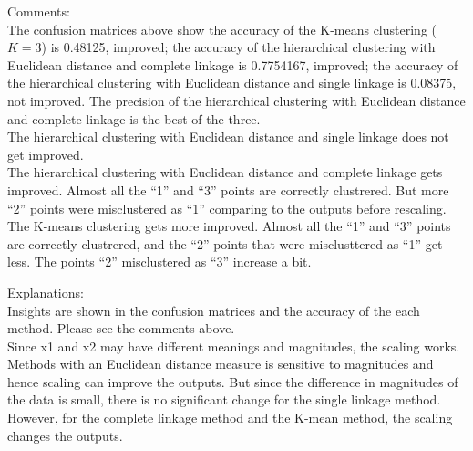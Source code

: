 \documentclass[10pt]{article}
\begin{document}
\begin{enumerate}[1)]
Comments:\\
The confusion matrices above show the accuracy of the K-means clustering ($K=3$) is 0.48125, improved; the accuracy of the hierarchical clustering with Euclidean distance and complete linkage is 0.7754167, improved; the accuracy of the hierarchical clustering with Euclidean distance and single linkage is 0.08375, not improved. The precision of the hierarchical clustering with Euclidean distance and complete linkage is the best of the three.\\
The hierarchical clustering with Euclidean distance and single linkage does not get improved.\\
The hierarchical clustering with Euclidean distance and complete linkage gets improved. Almost all the ``1'' and ``3'' points are correctly clustrered. But more ``2'' points were misclustered as ``1'' comparing to the outputs before rescaling.\\
The K-means clustering gets more improved. Almost all the ``1'' and ``3'' points are correctly clustrered, and the ``2'' points that were misclusttered as ``1'' get less. The points ``2'' misclustered as ``3'' increase a bit. %
\vspace{3mm}

Explanations:\\
Insights are shown in the confusion matrices and the accuracy of the each method. Please see the comments above.\\
Since x1 and x2 may have different meanings and magnitudes, the scaling works. Methods with an Euclidean distance measure is sensitive to magnitudes and hence scaling can improve the outputs. But since the difference in magnitudes of the data is small, there is no significant change for the single linkage method. However, for the complete linkage method and the K-mean method, the scaling changes the outputs.
\vspace{3mm}

\end{enumerate}
\vspace{3mm}
\end{document}

